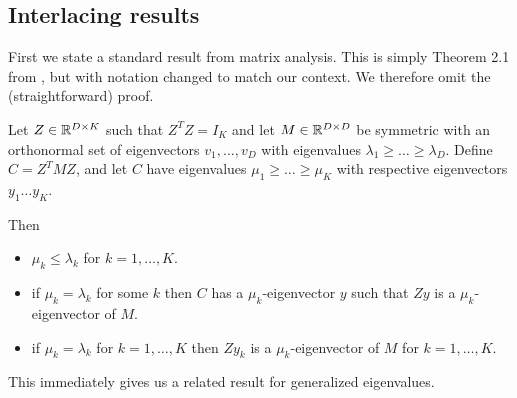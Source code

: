 \subsection{Interlacing results}
First we state a standard result from matrix analysis.
This is simply Theorem 2.1 from \citet{haemers_interlacing_1995}, but with notation changed to match our context. We therefore omit the (straightforward) proof.

\begin{lemma}\label{lem:haemers}
Let $Z \in \mathbb{R}^{D\times K}$ such that $Z^T Z = I_K$ and let $M \in \mathbb{R}^{D\times D}$ be symmetric with an orthonormal set of eigenvectors $v_1,\dots, v_D$ with eigenvalues $\lambda_1 \geq \dots \geq \lambda_D$.
Define $C = Z^T M Z$, and let $C$ have eigenvalues $\mu_1 \geq \dots \geq \mu_K$ with respective eigenvectors $y_1 \dots y_K$.

Then
\begin{itemize}
    \item $\mu_k \leq \lambda_k$ for $k=1,\dots,K$.
    \item if $\mu_k = \lambda_k$ for some $k$ then $C$ has a $\mu_k$-eigenvector $y$ such that $Zy$ is a $\mu_k$-eigenvector of $M$.
    \item if $\mu_k = \lambda_k$ for $k=1,\dots,K$ then $Zy_k$ is a $\mu_k$-eigenvector of $M$ for $k=1,\dots,K$.
\end{itemize}
\end{lemma}

This immediately gives us a related result for generalized eigenvalues.


